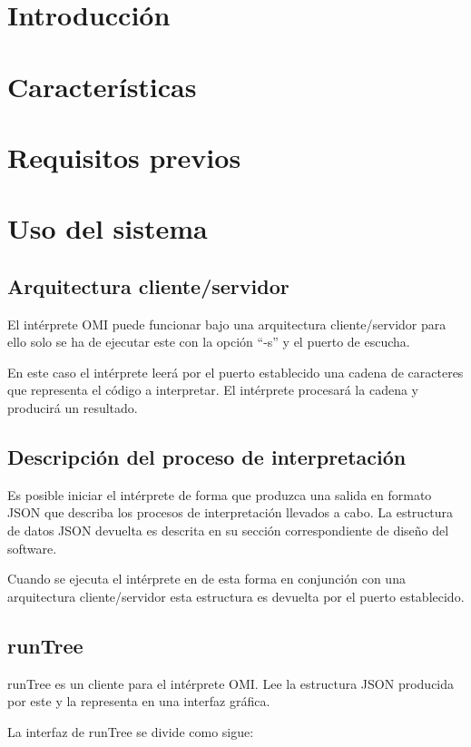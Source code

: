    
\section{Introducción}

\section{Características}

\section{Requisitos previos}

\section {Uso del sistema}

\subsection{Arquitectura cliente/servidor}
El intérprete OMI puede funcionar bajo una arquitectura cliente/servidor para ello solo se ha de ejecutar este con la opción ``-s'' y el puerto de
escucha. 

En este caso el intérprete leerá por el puerto establecido una cadena de caracteres que representa el código a interpretar. El intérprete procesará 
la cadena y producirá un resultado.

\subsection{Descripción del proceso de interpretación}
Es posible iniciar el intérprete de forma que produzca una salida en formato JSON que describa los procesos de interpretación llevados a cabo. La estructura 
de datos JSON devuelta es descrita en su sección correspondiente de diseño del software.

Cuando se ejecuta el intérprete en de esta forma en conjunción con una arquitectura cliente/servidor esta estructura es devuelta por el puerto establecido. 

\subsection{runTree} 
runTree es un cliente para el intérprete OMI. Lee la estructura JSON producida por este y la representa en una interfaz gráfica. 

La interfaz de runTree se divide como sigue:

